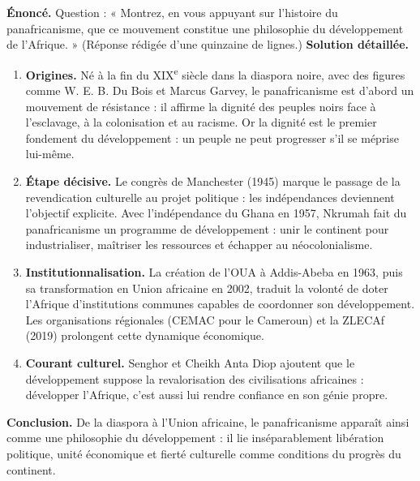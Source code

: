 \documentclass[11pt]{article}
\begin{document}
\begin{exoresolu}
\textbf{Énoncé.} Question : « Montrez, en vous appuyant sur l'histoire du panafricanisme, que ce mouvement constitue une philosophie du développement de l'Afrique. » (Réponse rédigée d'une quinzaine de lignes.)
\tcblower
\textbf{Solution détaillée.}
\begin{enumerate}
\item \textbf{Origines.} Né à la fin du XIX\textsuperscript{e} siècle dans la diaspora noire, avec des figures comme W. E. B. Du Bois et Marcus Garvey, le panafricanisme est d'abord un mouvement de résistance : il affirme la dignité des peuples noirs face à l'esclavage, à la colonisation et au racisme. Or la dignité est le premier fondement du développement : un peuple ne peut progresser s'il se méprise lui-même.
\item \textbf{Étape décisive.} Le congrès de Manchester (1945) marque le passage de la revendication culturelle au projet politique : les indépendances deviennent l'objectif explicite. Avec l'indépendance du Ghana en 1957, Nkrumah fait du panafricanisme un programme de développement : unir le continent pour industrialiser, maîtriser les ressources et échapper au néocolonialisme.
\item \textbf{Institutionnalisation.} La création de l'OUA à Addis-Abeba en 1963, puis sa transformation en Union africaine en 2002, traduit la volonté de doter l'Afrique d'institutions communes capables de coordonner son développement. Les organisations régionales (CEMAC pour le Cameroun) et la ZLECAf (2019) prolongent cette dynamique économique.
\item \textbf{Courant culturel.} Senghor et Cheikh Anta Diop ajoutent que le développement suppose la revalorisation des civilisations africaines : développer l'Afrique, c'est aussi lui rendre confiance en son génie propre.
\end{enumerate}
\textbf{Conclusion.} De la diaspora à l'Union africaine, le panafricanisme apparaît ainsi comme une philosophie du développement : il lie inséparablement libération politique, unité économique et fierté culturelle comme conditions du progrès du continent.
\end{exoresolu}
\end{document}
